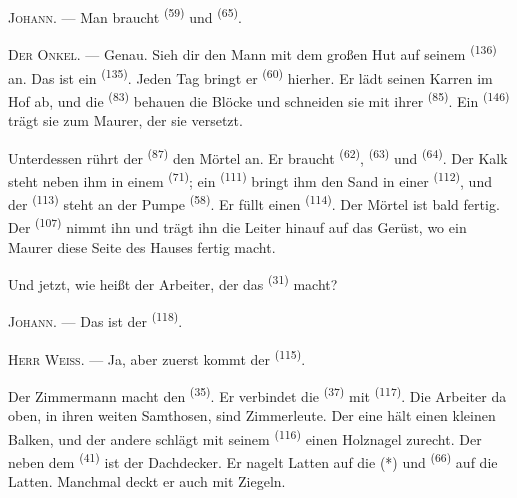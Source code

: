 \textsc{Johann}. --- Man braucht  \textsuperscript{(59)} und
 \textsuperscript{(65)}.

\textsc{Der Onkel}. --- Genau. Sieh dir den Mann mit dem großen Hut auf seinem
 \textsuperscript{(136)} an. Das ist ein 
\textsuperscript{(135)}. Jeden Tag bringt er 
\textsuperscript{(60)} hierher. Er lädt seinen Karren im Hof ab, und die
 \textsuperscript{(83)} behauen die Blöcke und schneiden sie mit
ihrer  \textsuperscript{(85)}. Ein 
\textsuperscript{(146)} trägt sie zum Maurer, der sie versetzt.

Unterdessen rührt der  \textsuperscript{(87)} den Mörtel an. Er
braucht  \textsuperscript{(62)},  \textsuperscript{(63)} und
 \textsuperscript{(64)}. Der Kalk steht neben ihm in einem
 \textsuperscript{(71)}; ein 
\textsuperscript{(111)} bringt ihm den Sand in einer 
\textsuperscript{(112)}, und der  \textsuperscript{(113)} steht an
der Pumpe \textsuperscript{(58)}. Er füllt einen 
\textsuperscript{(114)}. Der Mörtel ist bald fertig. Der 
\textsuperscript{(107)} nimmt ihn und trägt ihn die Leiter hinauf auf das Gerüst, wo
ein Maurer diese Seite des Hauses fertig macht.

Und jetzt, wie heißt der Arbeiter, der das  \textsuperscript{(31)}
macht?

\textsc{Johann}. --- Das ist der  \textsuperscript{(118)}.

\VUsaut{3.0mm}
\VUsaut{3.0mm}

\textsc{Herr Weiß}. --- Ja, aber zuerst kommt der 
\textsuperscript{(115)}.

Der Zimmermann macht den  \textsuperscript{(35)}. Er verbindet die
 \textsuperscript{(37)} mit 
\textsuperscript{(117)}. Die Arbeiter da oben, in ihren weiten Samthosen, sind
Zimmerleute. Der eine hält einen kleinen Balken, und der andere schlägt mit seinem
 \textsuperscript{(116)} einen Holznagel zurecht. Der neben dem
 \textsuperscript{(41)} ist der Dachdecker. Er nagelt Latten auf
die  (*) und  \textsuperscript{(66)} auf die
Latten. Manchmal deckt er auch mit Ziegeln.

